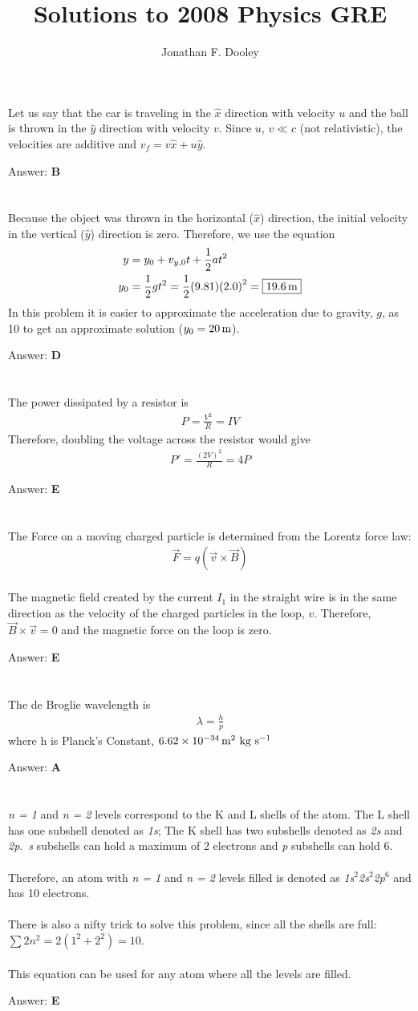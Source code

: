 \documentclass[12pt]{article}
\title{Solutions to 2008 Physics GRE}
\author{Jonathan F. Dooley}
\newcommand{\Answer}[1]{Answer: \textbf{#1}}
\newcommand{\Problem}[3]{
    \setcounter{section}{#1}
    \addtocounter{section}{-1}
    \section{}
    #3\par\par
    \Answer{#2}
}
\begin{document}


\Problem{1}{B}{
Let us say that the car is traveling in the $\hat{x}$ direction with velocity $u$ and the ball is thrown in the $\hat{y}$ direction with velocity $v$.
Since $u$, $v \ll c$ (not relativistic), the velocities are additive and $v_f = v \hat{x} + u \hat{y}$.
}

\Problem{2}{D}{
Because the object was thrown in the horizontal ($\hat{x}$) direction, the initial velocity in the vertical ($\hat{y}$) direction is zero. Therefore, we use the equation
%
\begin{align}
y &=  y_{0} + v_{y,0} t + \frac{1}{2} a t^2\\
y_{0} &= \frac{1}{2} g t^2 = \frac{1}{2} (9.81) {(2.0)}^2 = \boxed{19.6\,\text{m}}\nonumber
\end{align}
%
In this problem it is easier to approximate the acceleration due to gravity, $g$, as 10 to get an approximate solution ($y_{0} = 20\,\text{m}$).
}

\Problem{3}{E}{
The power dissipated by a resistor is
%
\begin{align}
P  = \frac{V^2}{R} = IV
\end{align}
%
Therefore, doubling the voltage across the resistor would give
%
\begin{align}
P' = \frac{{(2V)}^2}{R} = \boxed{4 P}\nonumber
\end{align}
}


\Problem{4}{E}{
The Force on a moving charged particle is determined from the Lorentz force law:
\begin{align}
\textbf{$\vec{F}$} = q (\textbf{$\vec{v}$}\times\textbf{$\vec{B}$})
\end{align}
\\
The magnetic field created by the current $I_{1}$ in the straight wire is in the same direction as the velocity of the charged particles in the loop, ${v}$. Therefore, $\vec{B} \times \vec{v}=0$ and the magnetic force on the loop is zero.
}

\Problem{5}{A}{
The de Broglie wavelength is
\begin{align}
\lambda = \frac{h}{p}
\end{align}
where h is Planck's Constant, $6.62\times 10^{-34}\,\text{m$^2$ kg s$^{-1}$}$
}

\Problem{6}{E}{
\textit{n = 1} and \textit{n = 2} levels correspond to the K and L shells of the atom. The L shell has one subshell denoted as \textit{1s}; The K shell has two subshells denoted as \textit{2s} and \textit{2p}.~\textit{s} subshells can hold a maximum of 2 electrons and \textit{p} subshells can hold 6.\\\\Therefore, an atom with \textit{n = 1} and \textit{n = 2} levels filled is denoted as \textit{1s$^2$2s$^2$2p$^6$} and has 10 electrons.\\\\
There is also a nifty trick to solve this problem, since all the shells are full: $\sum2n^{2} = 2(1^{2}+2^{2}) = 10$. \\\\This equation can be used for any atom where all the levels are filled.
}
\end{document}
